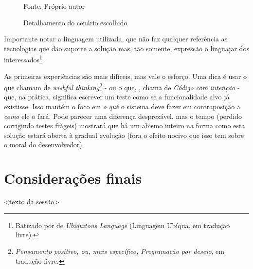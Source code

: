       \begin{figure}[h]
        \centering
        \caption{Detalhamento do cenário escolhido}
        
        Fonte: Próprio autor\footnotemark
        \label{fig:passos-primeiro-cenario-escolhido}
      \end{figure}

      Importante notar a linguagem utilizada, que não faz qualquer referência as
      tecnologias que dão suporte a solução mas, tão somente, expressão o
      linguajar dos interessados\footnote{Batizado por
       de \emph{Ubiquitous Language} (Linguagem Ubíqua, em tradução
      livre).}.

      As primeiras experiências são mais difíceis, mas vale o esforço. Uma dica
      é usar o que  chamam de \emph{
      wishful thinking}\footnote{\emph{Pensamento positivo, ou, mais
      específico, Programação por desejo}, em tradução livre.} - ou o que,
      , chama de \emph{Código com intenção}
      - que, na prática, significa escrever um teste como se a funcionalidade
      alvo já existisse. Isso mantém o foco em \emph{o quê} o sistema deve fazer
      em contraposição a \emph{como} ele o fará. Pode parecer uma diferença
      desprezável, mas o tempo (perdido corrigindo testes frágeis) mostrará que
      há um abismo inteiro na forma como esta solução estará aberta à gradual
      evolução (fora o efeito nocivo que isso tem sobre o moral do desenvolvedor).


  \section{Considerações finais}

    <texto da sessão>


  \clearpage

  \renewcommand\refname{Referências}

    
    


